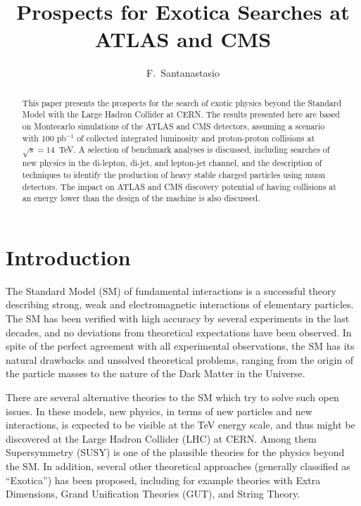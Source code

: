 \documentclass{cimento}
\title{Prospects for Exotica Searches at ATLAS and CMS}
\author{F.~Santanastasio\from{ins:UMD}\ETC
}
\begin{document}
\maketitle

\begin{abstract}
This paper presents the prospects for the search of exotic physics 
beyond the Standard Model with the Large Hadron Collider at CERN. 
The results presented here are based on Montecarlo simulations of the
ATLAS and CMS detectors, assuming a scenario with 
100 pb$^{-1}$ of collected integrated luminosity and proton-proton collisions 
at $\sqrt{s} = 14$~TeV. A selection of benchmark analyses is discussed, 
including searches of new physics in the di-lepton, di-jet, and lepton-jet channel, 
and the description of techniques to identify the production of 
heavy stable charged particles using muon detectors. 
The impact on ATLAS and CMS discovery potential 
of having collisions at an energy lower than the design of the machine 
is also discussed.
\end{abstract}

\section{Introduction}
The Standard Model (SM) of fundamental interactions is a successful theory 
describing strong, weak and electromagnetic interactions of elementary 
particles. The SM has been verified with high accuracy by several experiments 
in the last decades, and no deviations from theoretical expectations 
have been observed. In spite of the perfect agreement with all experimental 
observations, the SM has its natural drawbacks and unsolved theoretical 
problems, ranging from the origin of the particle masses to the nature of the 
Dark Matter in the Universe.

There are several alternative theories to the SM which try to solve such 
open issues. In these models, new physics, in terms of new particles and 
new interactions, is expected to be visible at the TeV energy scale, and 
thus might be discovered at the Large Hadron Collider (LHC) at CERN.
Among them Supersymmetry (SUSY) is one of the plausible theories for the physics 
beyond the SM. In addition, several other theoretical approaches (generally classified 
as ``Exotica'') has been proposed, including for example theories with Extra Dimensions, 
Grand Unification Theories (GUT), and String Theory. 
\end{document}
